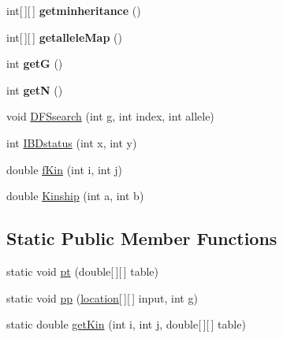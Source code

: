 \begin{DoxyCompactItemize}
\item 
\hypertarget{classsame_pedigree_1_1_pedigree_tree_a9c543c470354c4d3d207f4f7a2ddd539}{}int\mbox{[}$\,$\mbox{]}\mbox{[}$\,$\mbox{]} {\bfseries getminheritance} ()\label{classsame_pedigree_1_1_pedigree_tree_a9c543c470354c4d3d207f4f7a2ddd539}

\item 
\hypertarget{classsame_pedigree_1_1_pedigree_tree_a9b3ad14ea1e5d046cca81fd1fd7cb1ec}{}int\mbox{[}$\,$\mbox{]}\mbox{[}$\,$\mbox{]} {\bfseries getallele\+Map} ()\label{classsame_pedigree_1_1_pedigree_tree_a9b3ad14ea1e5d046cca81fd1fd7cb1ec}

\item 
\hypertarget{classsame_pedigree_1_1_pedigree_tree_a4b290da5ad0d9ebfbde9c94114e0b351}{}int {\bfseries get\+G} ()\label{classsame_pedigree_1_1_pedigree_tree_a4b290da5ad0d9ebfbde9c94114e0b351}

\item 
\hypertarget{classsame_pedigree_1_1_pedigree_tree_aab8f5e41565e0eebec5f5fa608a4aa4b}{}int {\bfseries get\+N} ()\label{classsame_pedigree_1_1_pedigree_tree_aab8f5e41565e0eebec5f5fa608a4aa4b}

\item 
void \hyperlink{classsame_pedigree_1_1_pedigree_tree_a26642a1c20fb11d1148f008e3801dde7}{D\+F\+Ssearch} (int g, int index, int allele)
\item 
int \hyperlink{classsame_pedigree_1_1_pedigree_tree_a9555676e4bb2b65dd270726573dc8e69}{I\+B\+Dstatus} (int x, int y)
\item 
double \hyperlink{classsame_pedigree_1_1_pedigree_tree_af260e4cfed11604d1cd4a2de8ed935f5}{f\+Kin} (int i, int j)
\item 
double \hyperlink{classsame_pedigree_1_1_pedigree_tree_a469c6b9e4a1bea93415356ccbd3122bb}{Kinship} (int a, int b)
\end{DoxyCompactItemize}
\subsection*{Static Public Member Functions}
\begin{DoxyCompactItemize}
\item 
static void \hyperlink{classsame_pedigree_1_1_pedigree_tree_a89ffca70669427a80628098981ade2e3}{pt} (double\mbox{[}$\,$\mbox{]}\mbox{[}$\,$\mbox{]} table)
\item 
static void \hyperlink{classsame_pedigree_1_1_pedigree_tree_a845f6ff5f5b021c927efe6d8782dc8b7}{pp} (\hyperlink{classbase_model_1_1location}{location}\mbox{[}$\,$\mbox{]}\mbox{[}$\,$\mbox{]} input, int g)
\item 
static double \hyperlink{classsame_pedigree_1_1_pedigree_tree_aeee4b719a5c5d948d39dec04497ea18b}{get\+Kin} (int i, int j, double\mbox{[}$\,$\mbox{]}\mbox{[}$\,$\mbox{]} table)
\end{DoxyCompactItemize}
